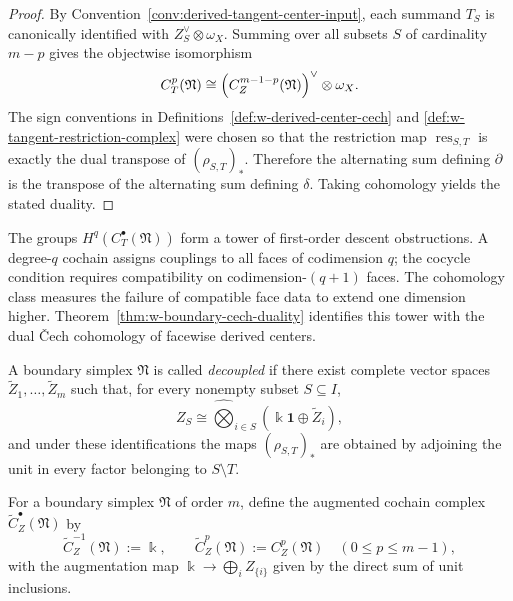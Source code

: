 \begin{proof}
By Convention~\ref{conv:derived-tangent-center-input}, each summand $T_S$ is canonically
identified with $Z_S^\vee\otimes \omega_X$. Summing over all subsets $S$ of cardinality $m-p$
gives the objectwise isomorphism
\[
C_T^p(\mathfrak N)
\cong
\Bigl(C_Z^{m-1-p}(\mathfrak N)\Bigr)^\vee\otimes \omega_X.
\]
The sign conventions in Definitions~\ref{def:w-derived-center-cech} and
\ref{def:w-tangent-restriction-complex} were chosen so that the restriction map
$\operatorname{res}_{S,T}$ is exactly the dual transpose of $(\rho_{S,T})_*$. Therefore the alternating
sum defining $\partial$ is the transpose of the alternating sum defining $\delta$.
Taking cohomology yields the stated duality.
\end{proof}

\begin{remark}[Interpretation]
\label{rem:w-boundary-cech-interpretation}
The groups $H^q(C_T^\bullet(\mathfrak N))$ form a tower of first-order descent obstructions.
A degree-$q$ cochain assigns couplings to all faces of codimension $q$; the cocycle condition
requires compatibility on codimension-$(q+1)$ faces. The cohomology class measures
the failure of compatible face data to extend one dimension higher.
Theorem~\ref{thm:w-boundary-cech-duality} identifies this tower with the dual \v{C}ech cohomology of
facewise derived centers.
\end{remark}

\begin{definition}
\label{def:w-decoupled-simplex}
A boundary simplex $\mathfrak N$ is called \emph{decoupled} if there exist complete vector spaces
$\widetilde Z_1,\dots,\widetilde Z_m$ such that, for every nonempty subset $S\subseteq I$,
\[
Z_S\cong \widehat\bigotimes_{i\in S}(\Bbbk\mathbf{1}\oplus \widetilde Z_i),
\]
and under these identifications the maps $(\rho_{S,T})_*$ are obtained by adjoining the unit in every
factor belonging to $S\setminus T$.
\end{definition}

\begin{definition}
\label{def:w-augmented-center-complex}
For a boundary simplex $\mathfrak N$ of order $m$, define the augmented cochain complex
$\widetilde C_Z^\bullet(\mathfrak N)$ by
\[
\widetilde C_Z^{-1}(\mathfrak N):=\Bbbk,
\qquad
\widetilde C_Z^p(\mathfrak N):=C_Z^p(\mathfrak N)\quad (0\le p\le m-1),
\]
with the augmentation map $\Bbbk\to \bigoplus_i Z_{\{i\}}$ given by the direct sum of unit inclusions.
\end{definition}

